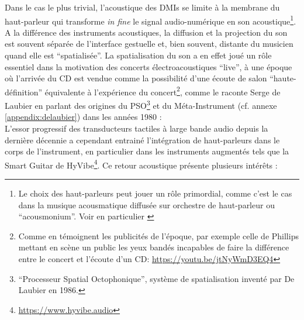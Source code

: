 \noindent Dans le cas le plus trivial, l'acoustique des \glspl{DMI} se limite à la membrane du haut-parleur qui transforme \textit{in fine} le signal audio-numérique en son acoustique\footnote{Le choix des haut-parleurs peut jouer un rôle primordial, comme c'est le cas dans la musique acousmatique diffusée sur orchestre de haut-parleur ou ``acousmonium''. Voir en particulier \cite{mooney_sound_2006}}. A la différence des instruments acoustiques, la diffusion et la projection du son est souvent séparée de l'interface gestuelle et, bien souvent, distante du musicien quand elle est ``spatialisée''. La spatialisation du son a en effet joué un rôle essentiel dans la motivation des concerts électroacoustiques ``live'', à une époque où l'arrivée du \gls{CD} est vendue comme la possibilité d'une écoute de salon ``haute-définition'' équivalente à l'expérience du concert\footnote{Comme en témoignent les publicités de l'époque, par exemple celle de Phillips mettant en scène un public les yeux bandés incapables de faire la différence entre le concert et l'écoute d'un \gls{CD}: \url{https://youtu.be/jtNyWmD3EQ4}}, comme le raconte Serge de Laubier en parlant des origines du PSO\footnote{``Processeur Spatial Octophonique'', système de spatialisation inventé par De Laubier en 1986.} et du Méta-Instrument (cf. annexe \ref{appendix:delaubier}) dans les années 1980 : \\
\indent L'essor progressif des transducteurs tactiles à large bande audio depuis la dernière décennie a cependant entrainé l'intégration de haut-parleurs dans le corps de l'instrument, en particulier dans les instruments augmentés tels que la Smart Guitar de HyVibe\footnote{\url{https://www.hyvibe.audio}}. Ce retour acoustique présente plusieurs intérêts :
\vspace{-1em}

